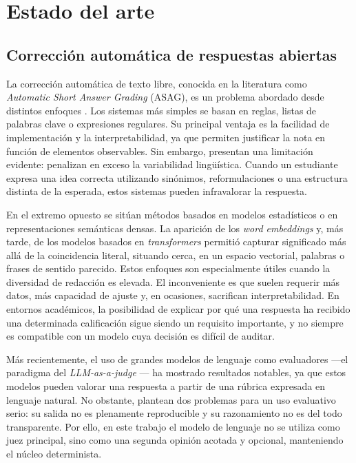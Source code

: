 \chapter{Estado del arte}
\label{cap:estado}

\section{Corrección automática de respuestas abiertas}

La corrección automática de texto libre, conocida en la literatura como \emph{Automatic Short Answer Grading} (ASAG), es un problema abordado desde distintos enfoques \parencite{burrows2015}. Los sistemas más simples se basan en reglas, listas de palabras clave o expresiones regulares. Su principal ventaja es la facilidad de implementación y la interpretabilidad, ya que permiten justificar la nota en función de elementos observables. Sin embargo, presentan una limitación evidente: penalizan en exceso la variabilidad lingüística. Cuando un estudiante expresa una idea correcta utilizando sinónimos, reformulaciones o una estructura distinta de la esperada, estos sistemas pueden infravalorar la respuesta.

En el extremo opuesto se sitúan métodos basados en modelos estadísticos o en representaciones semánticas densas. La aparición de los \emph{word embeddings} \parencite{mikolov2013} y, más tarde, de los modelos basados en \emph{transformers} permitió capturar significado más allá de la coincidencia literal, situando cerca, en un espacio vectorial, palabras o frases de sentido parecido. Estos enfoques son especialmente útiles cuando la diversidad de redacción es elevada. El inconveniente es que suelen requerir más datos, más capacidad de ajuste y, en ocasiones, sacrifican interpretabilidad. En entornos académicos, la posibilidad de explicar por qué una respuesta ha recibido una determinada calificación sigue siendo un requisito importante, y no siempre es compatible con un modelo cuya decisión es difícil de auditar.

Más recientemente, el uso de grandes modelos de lenguaje como evaluadores —el paradigma del \emph{LLM-as-a-judge} \parencite{zheng2023}— ha mostrado resultados notables, ya que estos modelos pueden valorar una respuesta a partir de una rúbrica expresada en lenguaje natural. No obstante, plantean dos problemas para un uso evaluativo serio: su salida no es plenamente reproducible y su razonamiento no es del todo transparente. Por ello, en este trabajo el modelo de lenguaje no se utiliza como juez principal, sino como una segunda opinión acotada y opcional, manteniendo el núcleo determinista.

